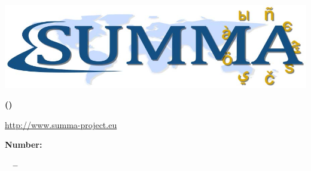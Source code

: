 \def\Reg{\raisebox{1ex}{\kern-.1em\setbox\@tempboxa\hbox{\footnotesize$\bigcirc$}\hbox
  to 0pt{\hbox to\wd\@tempboxa{\hss\tiny R\hss}\hss}\box\@tempboxa\kern-.1em}}

\pagestyle{fancy}
\chead{}
\lfoot{}
\rfoot{}
\setlength{\headheight}{16pt}
\renewcommand{\headrulewidth}{2.0pt}
\renewcommand{\footrulewidth}{2.0pt}

\renewcommand\arraystretch{1.1}

\newcommand{\tm}{\textsuperscript{\textregistered}}




	\hfill
	\centerline{\includegraphics[width=\textwidth]{./images/SummaLogoFinal.jpg}}

	\bigskip
	\begin{center}
	\textbf{\LARGE\sffamily \ProjectTitle}
	
	\smallskip
	\textbf{\LARGE\sffamily(\ProjectAcronym)}
	
	\smallskip
	{\large \url{http://www.summa-project.eu}}

	\bigskip
	\textbf{\Large {\FundingScheme}}

	\smallskip
	\textbf{\Large Number: \GrantNo}

	\smallskip
	\textbf{\Large \DeliverableNumber ~ -- ~\DeliverableName}

	\end{center}


